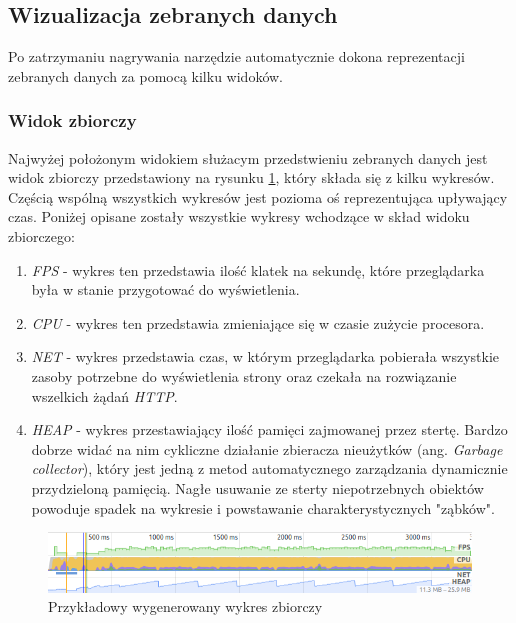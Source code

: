 \documentclass[polish, twoside, 12pt]{mwart}
\begin{document}
\subsection{Wizualizacja zebranych danych}

Po zatrzymaniu nagrywania narzędzie automatycznie dokona reprezentacji zebranych danych za pomocą kilku widoków.

\subsubsection{Widok zbiorczy}

Najwyżej położonym widokiem służacym przedstwieniu zebranych danych jest widok zbiorczy przedstawiony na rysunku \ref{fig:chrome-devtools-performance-summary-view}, który składa się z kilku wykresów. Częścią wspólną wszystkich wykresów jest pozioma oś reprezentująca upływający czas. Poniżej opisane zostały wszystkie wykresy wchodzące w skład widoku zbiorczego:

\begin{enumerate}
  \item \emph{FPS} - wykres ten przedstawia ilość klatek na sekundę, które przeglądarka była w stanie przygotować do wyświetlenia.
  \item \emph{CPU} - wykres ten przedstawia zmieniające się w czasie zużycie procesora.
  \item \emph{NET} - wykres przedstawia czas, w którym przeglądarka pobierała wszystkie zasoby potrzebne do wyświetlenia strony oraz czekała na rozwiązanie wszelkich żądań \emph{HTTP}.
  \item \emph{HEAP} - wykres przestawiający ilość pamięci zajmowanej przez stertę. Bardzo dobrze widać na nim cykliczne działanie zbieracza nieużytków (ang. \emph{Garbage collector}), który jest jedną z metod automatycznego zarządzania dynamicznie przydzieloną pamięcią. Nagłe usuwanie ze sterty niepotrzebnych obiektów powoduje spadek na wykresie i powstawanie charakterystycznych "{}ząbków".
\end{enumerate}

\begin{figure}[ht]
  \includegraphics[width=\textwidth]{chrome-devtools-performance-summary-view.png}
  \caption{Przykładowy wygenerowany wykres zbiorczy}
  \label{fig:chrome-devtools-performance-summary-view}
\end{figure}
\end{document}
